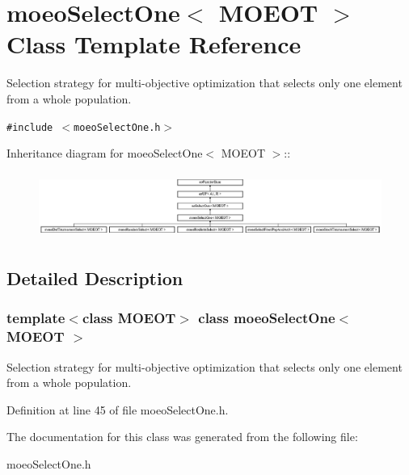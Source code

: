 \section{moeo\-Select\-One$<$ MOEOT $>$ Class Template Reference}
\label{classmoeoSelectOne}
Selection strategy for multi-objective optimization that selects only one element from a whole population.  


{\tt \#include $<$moeo\-Select\-One.h$>$}

Inheritance diagram for moeo\-Select\-One$<$ MOEOT $>$::\begin{figure}[H]
\begin{center}
\leavevmode
\includegraphics[height=2.17899cm]{classmoeoSelectOne}
\end{center}
\end{figure}


\subsection{Detailed Description}
\subsubsection*{template$<$class MOEOT$>$ class moeo\-Select\-One$<$ MOEOT $>$}

Selection strategy for multi-objective optimization that selects only one element from a whole population. 



Definition at line 45 of file moeo\-Select\-One.h.

The documentation for this class was generated from the following file:\begin{CompactItemize}
\item 
moeo\-Select\-One.h\end{CompactItemize}
